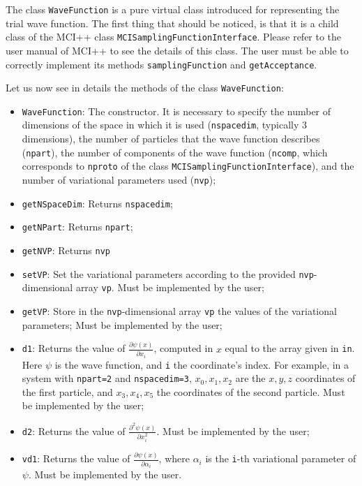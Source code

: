 \documentclass[11pt,a4paper,twoside]{article}
\begin{document}
The class \verb+WaveFunction+ is a pure virtual class introduced for representing the trial wave function.
The first thing that should be noticed, is that it is a child class of the MCI++ class \verb+MCISamplingFunctionInterface+.
Please refer to the user manual of MCI++ to see the details of this class.
The user must be able to correctly implement its methods \verb+samplingFunction+ and \verb+getAcceptance+.

Let us now see in details the methods of the class \verb+WaveFunction+:
\begin{itemize}
   \item \verb+WaveFunction+: The constructor. It is necessary to specify the number of dimensions of the space in which it is used (\verb+nspacedim+, typically $3$ dimensions), the number of particles that the wave function describes (\verb+npart+), the number of components of the wave function (\verb+ncomp+, which corresponds to \verb+nproto+ of the class \verb+MCISamplingFunctionInterface+), and the number of variational parameters used (\verb+nvp+);
   \item \verb+getNSpaceDim+: Returns \verb+nspacedim+;
   \item \verb+getNPart+: Returns \verb+npart+;
   \item \verb+getNVP+: Returns \verb+nvp+
   \item \verb+setVP+: Set the variational parameters according to the provided \verb+nvp+-dimensional array \verb+vp+. Must be implemented by the user;
   \item \verb+getVP+: Store in the \verb+nvp+-dimensional array \verb+vp+ the values of the variational parameters; Must be implemented by the user;
   \item \verb+d1+: Returns the value of $\frac{\partial \psi(x)}{\partial x_{i}}$, computed in $x$ equal to the array given in \verb+in+. Here $\psi$ is the wave function, and \verb+i+ the coordinate's index. For example, in a system with \verb+npart=2+ and \verb+nspacedim=3+, $x_0, x_1, x_2$ are the $x,y,z$ coordinates of the first particle, and $x_3,x_4,x_5$ the coordinates of the second particle. Must be implemented by the user;
   \item \verb+d2+: Returns the value of $\frac{\partial^2 \psi(x)}{\partial x_{i}^2}$. Must be implemented by the user;
   \item \verb+vd1+: Returns the value of $\frac{\partial \psi(x)}{\partial \alpha_{i}}$, where $\alpha_i$ is the \verb+i+-th variational parameter of $\psi$. Must be implemented by the user.
\end{itemize}
\end{document}
